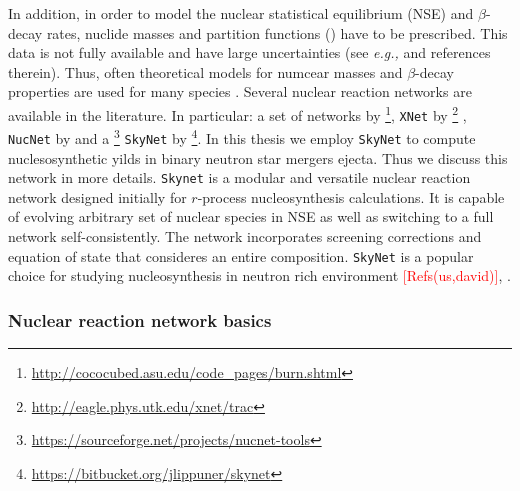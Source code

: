\documentclass[11pt,a4paper,headinclude=true,DIV=14,BCOR=8mm,chapterprefix,listof=totoc,twoside,openright,abstracton]{scrbook}
\newcommand{\red}[1]{\textcolor{red}{#1}}
\begin{document}
In addition, in order to model the nuclear statistical equilibrium (NSE) and $\beta$-decay rates, nuclide masses and partition functions (\cite{Arcones:2010dz,Brett:2012jn,Mendoza-Temis:2014mja,Mumpower:2015ova}) have to be prescribed. This data is not fully available and have large uncertainties (see \textit{e.g.,} \cite{Lunney:2003,Schatz:2013,Mumpower:2015ova} and references therein). Thus, often theoretical models for numcear masses and $\beta$-decay properties are used for many species \cite{Lunney:2003,Moller:2003,Mumpower:2015ova}. 
Several nuclear reaction networks are available in the literature. In particular: a set of networks by 
\cite{Timmes:1999} \footnote{\url{http://cococubed.asu.edu/code_pages/burn.shtml}}, 
\texttt{XNet} by \cite{Hix:1999} \footnote{\url{http://eagle.phys.utk.edu/xnet/trac}} , 
\texttt{NucNet} by \cite{Meyer:2007} and a  \footnote{\url{https://sourceforge.net/projects/nucnet-tools}}
\texttt{SkyNet} by \cite{Lippuner:2015gwa} \footnote{\url{https://bitbucket.org/jlippuner/skynet}}.
% 
In this thesis we employ \texttt{SkyNet} to compute nuclesosynthetic yilds in binary neutron star mergers ejecta. Thus we discuss this network in more details. \texttt{Skynet} is a modular and versatile nuclear reaction network designed initially for $r$-process nucleosynthesis calculations. It is capable of evolving arbitrary set of nuclear
species in NSE as well as switching to a full network self-consistently. The network incorporates screening corrections and equation of state that consideres an entire composition. 
% 
\texttt{SkyNet} is a popular choice for studying nucleosynthesis in neutron rich environment \cite{Lippuner:2015gwa,Radice:2016dwd,Roberts:2016igt,Lippuner:2017tyn,Siegel:2017nub,Vlasov:2017nou,Fernandez:2016sbf} \red{[Refs(us,david)]}, .


\subsubsection{Nuclear reaction network basics}
\end{document}

